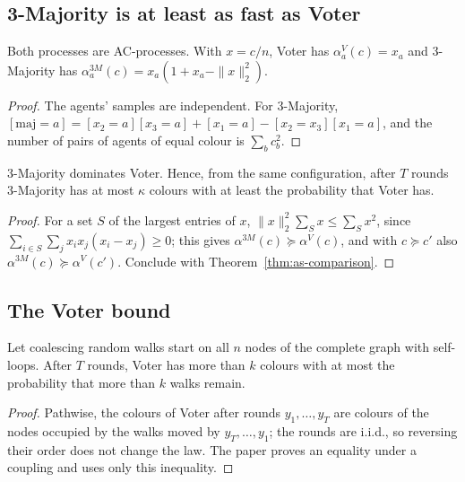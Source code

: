 \subsection{3-Majority is at least as fast as Voter}

\begin{lemma}\label{lem:as-alpha}
\leanok
{}
Both processes are AC-processes. With $x=c/n$, Voter has $\alpha^V_a(c)=x_a$ and 3-Majority has
$\alpha^{3M}_a(c)=x_a(1+x_a-\|x\|_2^2)$.
\end{lemma}
\begin{proof}\leanok
The agents' samples are independent. For 3-Majority,
$[\mathrm{maj}=a]=[x_2=a][x_3=a]+[x_1=a]-[x_2=x_3][x_1=a]$, and the number of pairs of agents of
equal colour is $\sum_b c_b^2$.
\end{proof}

\begin{lemma}[Lemma~2]\label{lem:as-vs-voter}
\leanok
{}
3-Majority dominates Voter. Hence, from the same configuration, after $T$ rounds 3-Majority has
at most $\kappa$ colours with at least the probability that Voter has.
\end{lemma}
\begin{proof}\leanok
For a set $S$ of the largest entries of $x$, $\|x\|_2^2\sum_S x\le\sum_S x^2$, since
$\sum_{i\in S}\sum_j x_ix_j(x_i-x_j)\ge0$; this gives $\alpha^{3M}(c)\succeq\alpha^V(c)$, and with
$c\succeq c'$ also $\alpha^{3M}(c)\succeq\alpha^V(c')$. Conclude with
Theorem~\ref{thm:as-comparison}.
\end{proof}

\subsection{The Voter bound}

\begin{lemma}\label{lem:as-dual}
\leanok
{}
Let coalescing random walks start on all $n$ nodes of the complete graph with self-loops. After
$T$ rounds, Voter has more than $k$ colours with at most the probability that more than $k$
walks remain.
\end{lemma}
\begin{proof}\leanok
Pathwise, the colours of Voter after rounds $y_1,\dots,y_T$ are colours of the nodes occupied
by the walks moved by $y_T,\dots,y_1$; the rounds are i.i.d., so reversing their order does not
change the law. The paper proves an equality under a coupling and uses only this inequality.
\end{proof}

